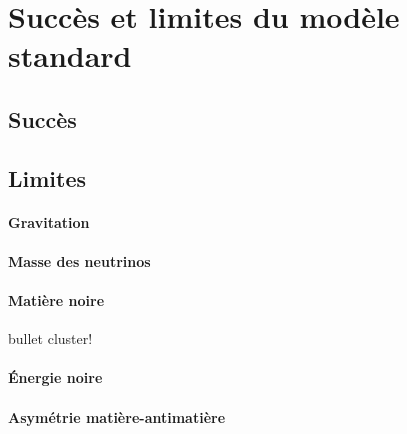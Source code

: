 \section{Succès et limites du modèle standard}
\subsection{Succès}

\subsection{Limites}
\paragraph{Gravitation}
\paragraph{Masse des neutrinos}
\paragraph{Matière noire}
bullet cluster!
\paragraph{Énergie noire}
\paragraph{Asymétrie matière-antimatière}